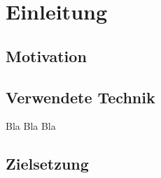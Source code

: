 \chapter{Einleitung} 

\section{Motivation}

\section{Verwendete Technik}
Bla Bla Bla
\section{Zielsetzung}
